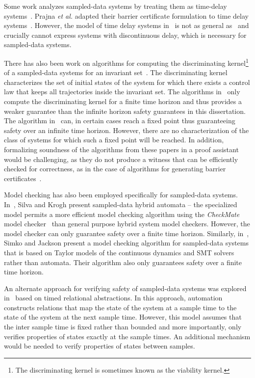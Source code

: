 Some work analyzes sampled-data systems by treating them as time-delay
systems~\cite{Fridman04delay}.  Prajna \emph{et al.} adapted their barrier
certificate formulation to time delay
systems~\cite{prajna05delay}. However, the model of time delay systems
in~\cite{prajna05delay} is not as general as~\cite{Fridman04delay} and
crucially cannot express systems with discontinuous delay, which is
necessary for sampled-data systems.

There has also been work on algorithms for computing the discriminating
kernel\footnote{The discriminating kernel is sometimes known as the
  viability kernel.} of a sampled-data systems for an invariant
set~\cite{mitchell2015improved,mitchell2013safety,Gillula14sampled}. The
discriminating kernel characterizes the set of initial states of the system
for which there exists a control law that keeps all trajectories inside the
invariant set.  The algorithms
in~\cite{mitchell2015improved,Gillula14sampled} only compute the
discriminating kernel for a finite time horizon and thus provides a weaker
guarantee than the infinite horizon safety guarantees in this
dissertation. The algorithm in~\cite{mitchell2013safety} can, in certain
cases reach a fixed point thus guaranteeing safety over an infinite time
horizon. However, there are no characterization of the class of systems for
which such a fixed point will be reached. In addition, formalizing
soundness of the algorithms from these papers in a proof assistant would be
challenging, as they do not produce a witness that can be efficiently
checked for correctness, as in the case of algorithms for generating
barrier certificates~\cite{Dai17revisited,kong2013barrier,Zeng16barrier}.

Model checking has also been employed specifically for sampled-data
systems. In~\cite{silva01sampled}, Silva and Krogh present sampled-data
hybrid automata -- the specialized model permits a more efficient model
checking algorithm using the \emph{CheckMate} model
checker~\cite{silva2000modeling} than general purpose hybrid system model
checkers. However, the model checker can only guarantee safety over a
finite time horizon. Similarly, in~\cite{simko14bmc}, Simko and Jackson
present a model checking algorithm for sampled-data systems that is based
on Taylor models of the continuous dynamics and SMT solvers rather than
automata. Their algorithm also only guarantees safety over a finite time
horizon.

An alternate approach for verifying safety of sampled-data systems was
explored in~\cite{Zutshi12sampled} based on timed relational
abstractions. In this approach, automation constructs relations that map
the state of the system at a sample time to the state of the system at the
next sample time. However, this model assumes that the inter sample time is
fixed rather than bounded and more importantly, only verifies properties of
states exactly at the sample times. An additional mechanism would be needed
to verify properties of states between samples.

